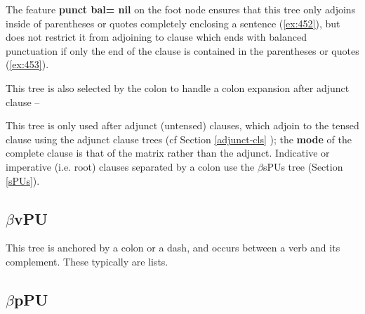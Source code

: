  
The feature {\bf punct bal= nil} on the foot node ensures that this 
tree only adjoins inside of parentheses or quotes completely enclosing 
a sentence (\ref{ex:452}), but does not restrict it from adjoining to clause 
which ends with balanced punctuation if only the end of the clause is 
contained in the parentheses or quotes (\ref{ex:453}). 
 
\beginsentences
{}\label{ex:452} 
\label{ex:453} 
\label{ex:454} 
\endsentences

 
This tree is also selected by the colon to handle a colon expansion 
after adjunct clause -- 
 
\beginsentences
{}\label{ex:455} 
\endsentences

 
\beginsentences
{}\label{ex:456} 
\endsentences

 
\beginsentences
{}\label{ex:457} 
\endsentences

 
This tree is only used after adjunct (untensed) clauses, which adjoin 
to the tensed clause using the adjunct clause trees (cf Section 
\ref{adjunct-cls} ); the {\bf mode} of the complete clause is that of 
the matrix rather than the adjunct. Indicative or imperative 
(i.e. root) clauses separated by a colon use the $\beta$sPUs tree 
(Section \ref{sPUs}). 
 
\subsection{$\beta$vPU} 
 
 
This tree is anchored by a colon or a dash, and occurs between a verb 
and its complement. These typically are lists. 
 
\beginsentences
{}\label{ex:458} 
\endsentences

 
\subsection{$\beta$pPU} 
 
